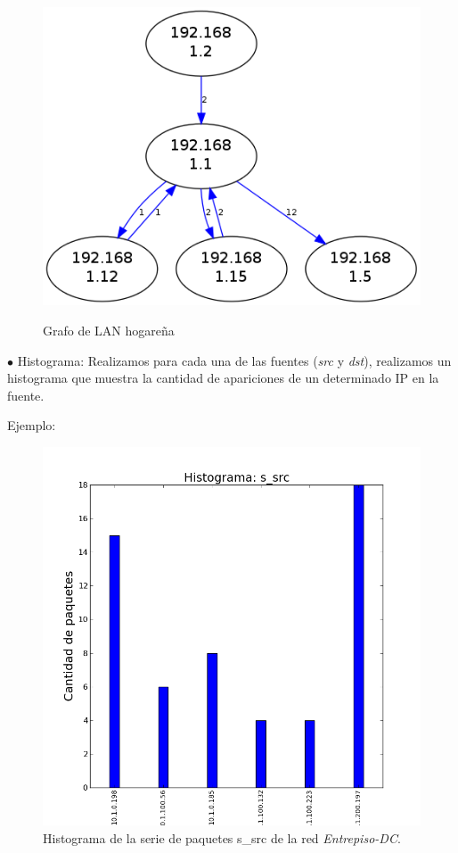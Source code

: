 \documentclass[10pt, a4paper]{article}
\begin{document}
  \begin{figure}[H]
  \begin{center}
    \includegraphics[width=\linewidth/2]{../imgs/pruebaFede-ips_red.png}
    \label{fig:FedeGrafo}
    \caption{Grafo de LAN hogareña}
  \end{center}
\end{figure}

$\bullet$ Histograma:
  Realizamos para cada una de las fuentes (\emph{src} y \emph{dst}), realizamos un histograma que muestra la cantidad de apariciones de un determinado IP en la fuente.
  
  Ejemplo:
  
  \begin{figure}[H]
  \begin{center}
    \includegraphics[width=\linewidth/2]{../imgs/entrepiso-dc-ips_s_src_hist.png}
    \caption{Histograma de la serie de paquetes s\_src de la red \emph{Entrepiso-DC}.}
    \label{fig:histograma-entrepiso-dc-s-src}
  \end{center}
  \end{figure}
  
\end{document}
